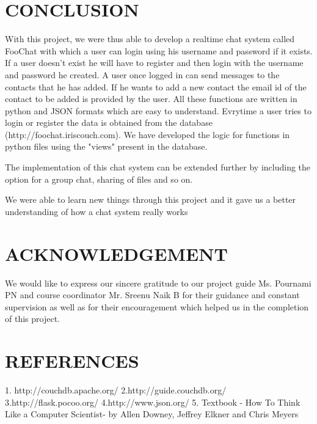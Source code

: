 \documentclass[a4paper,11pt,conference]{IEEEtran}
\begin{document}
\section{CONCLUSION}
		With this project, we were thus able to develop a realtime chat system called FooChat with which a user can login using his username and password if it exists. If a user doesn't exist he will have to register and then login with the username and password he created. A user once logged in can send messages to the contacts that he has added. If he wants to add a new contact the email id of the contact to be added is provided by the user. All these functions are written in python and JSON formats which are easy to understand. Evrytime a user tries to login or register the data is obtained from the database (http://foochat.iriscouch.com).  We have developed the logic for functions in python files using the "views" present in the database.
		
		The implementation of this chat system can be extended further by including the option for a group chat, sharing of files and so on.
		
		We were able to learn new things through this project and it gave us a better understanding of how a chat system really works


\section{ACKNOWLEDGEMENT}
		We would like to express our sincere gratitude to our project guide Ms. Pournami PN and course coordinator Mr. Sreenu Naik B for their guidance and constant supervision as well as for their encouragement which helped us in the completion of this project.


\section{REFERENCES}
		1. http://couchdb.apache.org/
		2.http://guide.couchdb.org/
		3.http://flask.pocoo.org/
		4.http://www.json.org/
		5. Textbook -  How To Think Like a Computer Scientist- by Allen Downey,  Jeffrey Elkner and Chris Meyers
\end{document}
